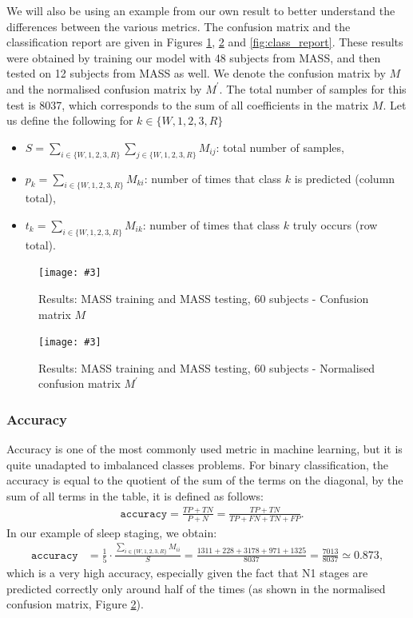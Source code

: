 \documentclass[titlepage, 11pt, a4paper, fancysections]{article}
\newcommand{\fig}[5]{\begin{figure}[#1] \centering \texttt{[image: \#3]} \caption{#4} \label{#5} \end{figure}}
\begin{document}
We will also be using an example from our own result to better understand the differences between the various metrics. The confusion matrix and the classification report are given in Figures \ref{fig:conf_mat}, \ref{fig:norm_conf_mat} and \ref{fig:class_report}. These results were obtained by training our model with 48 subjects from MASS, and then tested on 12 subjects from MASS as well. We denote the confusion matrix by $M$ and the normalised confusion matrix by $M^\prime$. The total number of samples for this test is 8037, which corresponds to the sum of all coefficients in the matrix $M$. 
Let us define the following for $k \in \{W, 1, 2, 3, R\}$
\begin{itemize}
    \item $S = \sum_{i \in \{W, 1, 2, 3, R\}}\sum_{j \in \{W, 1, 2, 3, R\}} M_{ij}$: total number of samples,
    \item $p_k=\sum_{i \in \{W, 1, 2, 3, R\}} M_{ki}$: number of times that class $k$ is predicted (column total),
    \item $t_k=\sum_{i \in \{W, 1, 2, 3, R\}} M_{ik}$: number of times that class $k$ truly occurs (row total).
\end{itemize}

\fig{!ht}{.7\linewidth}{metrics/conf_mat.png}{Results: MASS training and MASS testing, 60 subjects - Confusion matrix $M$}{fig:conf_mat}

\fig{!ht}{.7\linewidth}{metrics/norm_conf_mat.png}{Results: MASS training and MASS testing, 60 subjects - Normalised confusion matrix $M^\prime$}{fig:norm_conf_mat}

\subsubsection{Accuracy}
Accuracy is one of the most commonly used metric in machine learning, but it is quite unadapted to imbalanced classes problems. 
For binary classification, the accuracy is equal to the quotient of the sum of the terms on the diagonal, by the sum of all terms in the table, it is defined as follows:
\begin{align*}
   &\texttt{accuracy} = \frac{TP+TN}{P+N} = \frac{TP+TN}{TP+FN+TN+FP}.
\end{align*}
In our example of sleep staging, we obtain:
\begin{align*}
    \texttt{accuracy} &= \frac{1}{5}\cdot\frac{\sum_{i \in \{W, 1, 2, 3, R\}} M_{ii}}{S} =\frac{1311+228+3178+971+1325}{8037} = \frac{7013}{8037} \simeq 0.873,
\end{align*}
which is a very high accuracy, especially given the fact that N1 stages are predicted correctly only around half of the times (as shown in the normalised confusion matrix, Figure \ref{fig:norm_conf_mat}).
\end{document}
